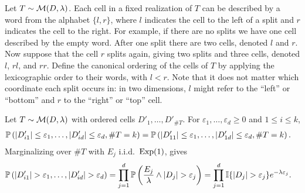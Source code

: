 \begin{definition}
  Let $T \sim \cM(D, \lambda)$.
  Each cell in a fixed realization of $T$ can be described by
  a word from the alphabet $\{l, r\}$,
  where $l$ indicates the cell to the left of a split
  and $r$ indicates the cell to the right.
  For example, if there are no splits we have one cell
  described by the empty word.
  After one split there are two cells, denoted
  $l$ and $r$.
  Now suppose that the cell $r$ splits again, giving two splits and three cells,
  denoted $l$, $r l$, and $r r$.
  Define the canonical ordering of the cells of $T$ by applying
  the lexicographic order to their words, with $l < r$.
  Note that it does not matter which coordinate each split occurs in:
  in two dimensions, $l$ might refer to the ``left'' or ``bottom''
  and $r$ to the ``right'' or ``top'' cell.
\end{definition}

\begin{lemma}
  \label{lem:mondrian_app_cells_identically_distributed}

  Let $T \sim \cM(D, \lambda)$
  with ordered cells $D'_1, \ldots, D'_{\# T}$.
  For $\varepsilon_1, \ldots, \varepsilon_d \geq 0$
  and $1 \leq i \leq k$,
  \begin{align*}
    \P\left(
      |D'_{i1}| \leq \varepsilon_1,
      \ldots, |D'_{id}| \leq \varepsilon_d,
      \# T = k
    \right)
    &=
    \P\left(
      |D'_{11}| \leq \varepsilon_1,
      \ldots, |D'_{1d}| \leq \varepsilon_d,
      \# T = k
    \right).
  \end{align*}
  Marginalizing over $\# T$
  with $E_j$ i.i.d.\ $\Exp(1)$,
  \citet[Proposition~1]{mourtada2020minimax} gives
  \begin{align*}
    \P\left(
      |D'_{i1}| > \varepsilon_1,
      \ldots, |D'_{id}| > \varepsilon_d
    \right)
    &=
    \prod_{j=1}^d
    \P\left(
      \frac{E_j}{\lambda} \wedge |D_j|
      > \varepsilon_j
    \right)
    = \prod_{j=1}^d
    \I\{|D_j| > \varepsilon_j\}
    e^{-\lambda \varepsilon_j}.
  \end{align*}

\end{lemma}

